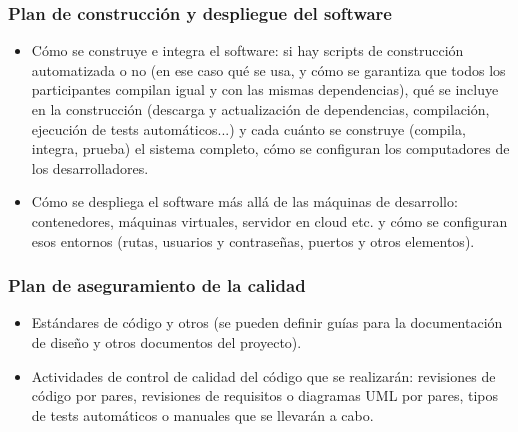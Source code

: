 \documentclass[12pt]{article}%
\begin{document}
\subsubsection{Plan de construcci\'on y despliegue del software}

\begin{itemize}
	\item C\'omo se construye e integra el software: si hay scripts de construcci\'on automatizada o no (en ese caso qu\'e se usa, y c\'omo se garantiza que todos los participantes compilan igual y con las mismas dependencias), qu\'e se incluye en la construcci\'on (descarga y actualizaci\'on de dependencias, compilaci\'on, ejecuci\'on de tests autom\'aticos...) y cada cu\'anto se construye (compila, integra, prueba) el sistema completo, c\'omo se configuran los computadores de los desarrolladores.
	\item C\'omo se despliega el software m\'as all\'a de las m\'aquinas de desarrollo: contenedores, m\'aquinas virtuales, servidor en cloud etc. y c\'omo se configuran esos entornos (rutas, usuarios y contraseñas, puertos y otros elementos).
\end{itemize}

\subsubsection{Plan de aseguramiento de la calidad}

\begin{itemize}
	\item Est\'andares de c\'odigo y otros (se pueden definir gu\'ias para la documentaci\'on de diseño y otros documentos del proyecto).
	\item Actividades de control de calidad del c\'odigo que se realizar\'an: revisiones de c\'odigo por pares, revisiones de requisitos o diagramas UML por pares, tipos de tests autom\'aticos o manuales que se llevar\'an a cabo.
\end{itemize}
\end{document}
